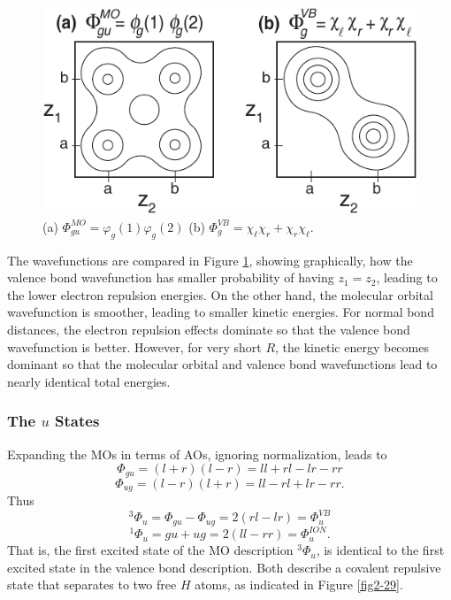\begin{figure}
\begin{center}
\includegraphics[scale=0.75]{fig2-28}
\end{center}
\caption{ (a) $\Phi^{MO}_{gu} = \varphi_g ( 1 ) \varphi_g(2)$
(b) $\Phi^{VB}_g = \chi_\ell \chi_r + \chi_r \chi_\ell$.}
\label{fig2-28}
\end{figure}

The wavefunctions are compared in Figure \ref{fig2-28}, showing
graphically, how the valence bond wavefunction has smaller probability
of having $z_1 = z_2$, leading to the lower electron repulsion
energies. On the other hand, the molecular orbital wavefunction is
smoother, leading to smaller kinetic energies.  For normal bond
distances, the electron repulsion effects dominate so that the valence
bond wavefunction is better. However, for very short $R$, the kinetic
energy becomes dominant so that the molecular orbital and valence bond
wavefunctions lead to nearly identical total energies.

\subsubsection{The $u$ States}

Expanding the MOs in terms of AOs, ignoring
normalization, leads to
\begin{equation}
\Phi_{gu} = \left( l + r \right) \left( l - r \right) = ll + rl - lr - 
rr
\end{equation}    
\begin{equation}
\Phi_{ug} = \left( l - r \right) \left( l + r \right) = ll - rl + lr - 
rr .
\end{equation}   
Thus
\begin{equation}
{^3}\Phi_u = \Phi_{gu} - \Phi_{ug} = 2 \left( r l - l r \right) = 
\Phi^{VB}_u
\end{equation}
\begin{equation}
{^1}\Phi_u = gu + ug = 2 \left( l l - r r \right) = 
\Phi^{ION}_u .
\end{equation}  
That is, the first excited state of the MO description
$^3\Phi_u$, is identical to the first excited state in the valence
bond description. Both describe a covalent repulsive state that
separates to two free $H$ atoms, as indicated in Figure
\ref{fig2-29}. 

